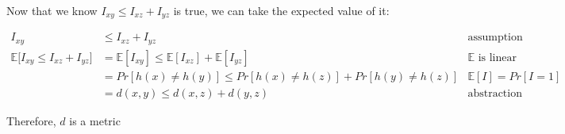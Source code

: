 \documentclass[11pt]{article}
\begin{document}
Now that we know $I_{xy} \le I_{xz} + I_{yz}$ is true, we can take the expected value of it:

\begin{align*}
I_{xy} &\le I_{xz} + I_{yz} &\text{assumption}\\
\mathbb{E}\Big[I_{xy} \le I_{xz} + I_{yz}\Big] &= \mathbb{E}[I_{xy}] \le \mathbb{E}[I_{xz}] + \mathbb{E}[I_{yz}] &\mathbb{E}\text{ is linear}\\
  &= Pr[h(x)\neq h(y)] \le Pr[h(x)\neq h(z)] + Pr[h(y)\neq h(z)] &\mathbb{E}[I] = Pr[I = 1]\\
  &= d(x,y) \le d(x,z) + d(y,z) &\text{abstraction}
\end{align*}

Therefore, $d$ is a metric
\end{document}
